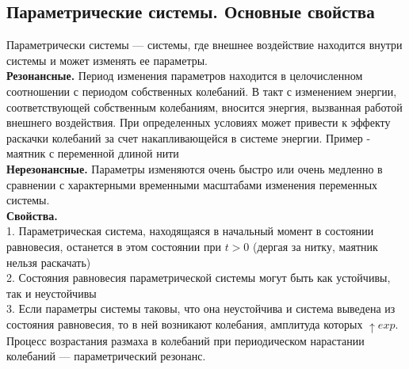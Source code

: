\begin{multicols*}{2}
		\section{Параметрические системы. Основные свойства}
		Параметрически системы — системы, где внешнее воздействие находится внутри системы и может изменять ее параметры.\\
		\textbf{Резонансные. } Период изменения параметров находится в целочисленном соотношении с периодом собственных колебаний. В такт с изменением энергии, соответствующей собственным колебаниям, вносится энергия, вызванная работой внешнего воздействия. При определенных условиях может привести к эффекту раскачки колебаний за счет накапливающейся в системе энергии. Пример - маятник с переменной длиной нити\\
		\textbf{Нерезонансные. }Параметры изменяются очень быстро или очень медленно в сравнении с характерными временными масштабами изменения переменных системы.\\
		\textbf{Свойства.}\\
		1. Параметрическая система, находящаяся в начальный момент в состоянии равновесия, останется в этом состоянии при $t>0$ (дергая за нитку, маятник нельзя раскачать)\\
		2. Состояния равновесия параметрической системы могут быть как устойчивы, так и неустойчивы\\
		3. Если параметры системы таковы, что она неустойчива и система выведена из состояния равновесия, то в ней возникают колебания, амплитуда которых $\uparrow exp$. Процесс возрастания размаха в колебаний при периодическом нарастании колебаний — параметрический резонанс.
		

\end{multicols*}
